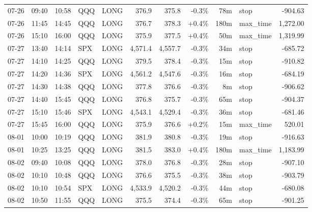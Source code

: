 \documentclass[11pt,a4paper,twoside]{article}
\begin{document}
\begin{center}
\begin{longtable}{>{\color{txtmain}}l l l l l r r r r >{\color{txtmain}}l r}
07-26 & 09:40 & 10:58 & QQQ & LONG & 376.9 & 375.8 & \textcolor{lossred}{-0.3\%} & 78m & stop & \textcolor{lossred}{-904.63} \\
07-26 & 11:45 & 14:45 & QQQ & LONG & 376.7 & 378.3 & \textcolor{wingreen}{+0.4\%} & 180m & max\_time & \textcolor{wingreen}{1,272.00} \\
07-26 & 15:10 & 16:00 & QQQ & LONG & 375.9 & 377.5 & \textcolor{wingreen}{+0.4\%} & 50m & max\_time & \textcolor{wingreen}{1,319.99} \\
07-27 & 13:40 & 14:14 & SPX & LONG & 4,571.4 & 4,557.7 & \textcolor{lossred}{-0.3\%} & 34m & stop & \textcolor{lossred}{-685.72} \\
07-27 & 14:10 & 14:25 & QQQ & LONG & 379.5 & 378.4 & \textcolor{lossred}{-0.3\%} & 15m & stop & \textcolor{lossred}{-910.82} \\
07-27 & 14:20 & 14:36 & SPX & LONG & 4,561.2 & 4,547.6 & \textcolor{lossred}{-0.3\%} & 16m & stop & \textcolor{lossred}{-684.19} \\
07-27 & 14:30 & 14:38 & QQQ & LONG & 377.8 & 376.6 & \textcolor{lossred}{-0.3\%} & 8m & stop & \textcolor{lossred}{-906.62} \\
07-27 & 14:40 & 15:45 & QQQ & LONG & 376.8 & 375.7 & \textcolor{lossred}{-0.3\%} & 65m & stop & \textcolor{lossred}{-904.37} \\
07-27 & 15:10 & 15:46 & SPX & LONG & 4,543.1 & 4,529.4 & \textcolor{lossred}{-0.3\%} & 36m & stop & \textcolor{lossred}{-681.46} \\
07-27 & 15:45 & 16:00 & QQQ & LONG & 375.9 & 376.6 & \textcolor{wingreen}{+0.2\%} & 15m & max\_time & \textcolor{wingreen}{520.01} \\
08-01 & 10:00 & 10:19 & QQQ & LONG & 381.9 & 380.8 & \textcolor{lossred}{-0.3\%} & 19m & stop & \textcolor{lossred}{-916.63} \\
08-01 & 10:25 & 13:25 & QQQ & LONG & 381.5 & 383.0 & \textcolor{wingreen}{+0.4\%} & 180m & max\_time & \textcolor{wingreen}{1,183.99} \\
08-02 & 09:40 & 10:08 & QQQ & LONG & 378.0 & 376.8 & \textcolor{lossred}{-0.3\%} & 28m & stop & \textcolor{lossred}{-907.10} \\
08-02 & 10:10 & 10:48 & QQQ & LONG & 376.6 & 375.5 & \textcolor{lossred}{-0.3\%} & 38m & stop & \textcolor{lossred}{-903.79} \\
08-02 & 10:10 & 10:54 & SPX & LONG & 4,533.9 & 4,520.2 & \textcolor{lossred}{-0.3\%} & 44m & stop & \textcolor{lossred}{-680.08} \\
08-02 & 10:50 & 11:55 & QQQ & LONG & 375.5 & 374.4 & \textcolor{lossred}{-0.3\%} & 65m & stop & \textcolor{lossred}{-901.25} \\

\end{longtable}
\end{center}
\end{document}
